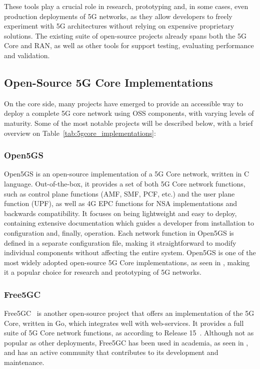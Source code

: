 These tools play a crucial role in research, prototyping and, in some cases, even production deployments of 5G networks, as they allow developers to freely experiment with 5G architectures without relying on expensive proprietary solutions. The existing suite of open-source projects already spans both the 5G Core and \gls{RAN}, as well as other tools for support testing, evaluating performance and validation.

\subsection{Open-Source 5G Core Implementations}
\label{sec:open_source_5g_core_implementations}%
On the core side, many projects have emerged to provide an accessible way to deploy a complete 5G core network using \gls{OSS} components, with varying levels of maturity. Some of the most notable projects will be described below, with a brief overview on Table~\ref{tab:5gcore_implementations}:

\subsubsection{Open5GS}
Open5GS \cite{open5gs_repo} is an open-source implementation of a 5G Core network, written in C language. Out-of-the-box, it provides a set of both 5G Core network functions, such as control plane functions (\gls{AMF}, \gls{SMF}, \gls{PCF}, etc.) and the user plane function (\gls{UPF}), as well as 4G \gls{EPC} functions for \gls{NSA} implementations and backwards compatibility. It focuses on being lightweight and easy to deploy, containing extensive documentation which guides a developer from installation to configuration and, finally, operation. Each network function in Open5GS is defined in a separate configuration file, making it straightforward to modify individual components without affecting the entire system.
Open5GS is one of the most widely adopted open-source 5G Core implementations, as seen in \cites{bonati2025_5gct}{horstmann2025open5gcube}{mamushiane2023deploying}{tio2025exploring5g}, making it a popular choice for research and prototyping of 5G networks.

\subsubsection{Free5GC}
\label{sec:free5gc}

Free5GC~\cite{free5gc_repo} is another open-source project that offers an implementation of the 5G Core, written in Go, which integrates well with web-services. It provides a full suite of 5G Core network functions, as according to  Release 15~\cite{3GPPRelease15}. Although not as popular as other deployments, Free5GC has been used in academia, as seen in \cite{horstmann2025open5gcube}, and has an active community that contributes to its development and maintenance.


